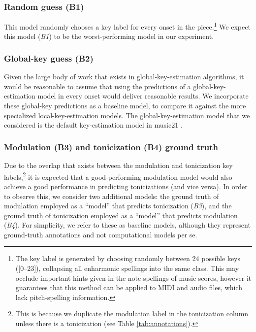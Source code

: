 \documentclass[sigconf]{acmart}
\begin{document}
\subsubsection{Random guess (B1)}
This model randomly chooses a key label for every onset in the piece.\footnote{
The key label is generated by choosing randomly between 24 possible keys ([0--23]), collapsing all enharmonic spellings into the same class. 
This may occlude important hints given in the note spellings of music scores, however it guarantees that this method can be applied to MIDI and audio files, which lack pitch-spelling information.} 
We expect this model (\emph{B1}) to be the worst-performing model in our experiment.

\subsubsection{Global-key guess (B2)}
Given the large body of work that exists in global-key-estimation algorithms, it would be reasonable to assume that using the predictions of a global-key-estimation model in every onset would deliver reasonable results. 
We incorporate these global-key predictions as a baseline model, to compare it against the more specialized local-key-estimation models. 
The global-key-estimation model that we considered is the default key-estimation model in music21 \cite{cuthbert2010music21}.

\subsubsection{Modulation (B3) and tonicization (B4) ground truth}

Due to the overlap that exists between the modulation and tonicization key labels,\footnote{This is because we duplicate the modulation label in the tonicization column unless there is a tonicization (see Table \ref{tab:annotations}).} it is expected that a good-performing modulation model would also achieve a good performance in predicting tonicizations (and vice versa). 
In order to observe this, we consider two additional models: the ground truth of modulation employed as a ``model'' that predicts tonicization (\emph{B3}), and the ground truth of tonicization employed as a ``model'' that predicts modulation (\emph{B4}). 
For simplicity, we refer to these as baseline models, although they represent ground-truth annotations and not computational models per se.
\end{document}
